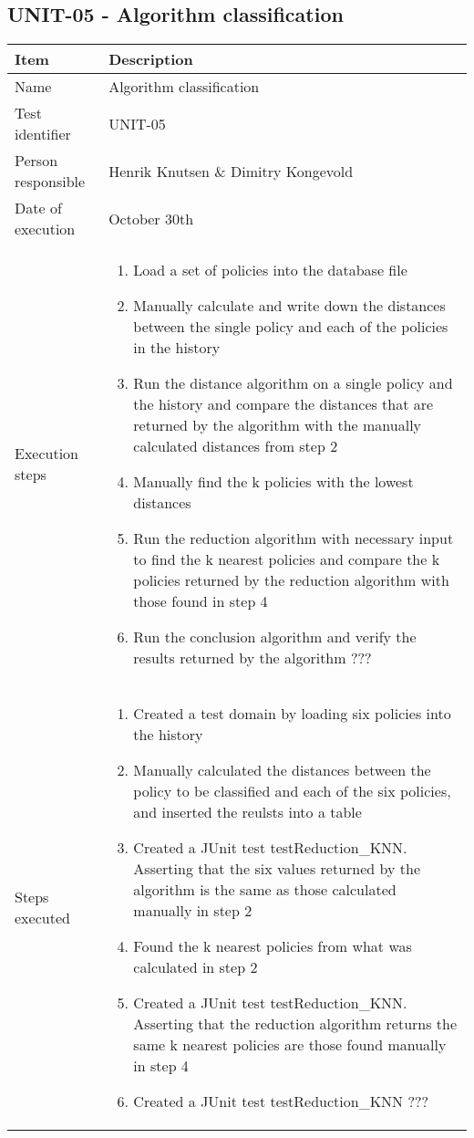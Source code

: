 \documentclass[a4paper]{article}
\begin{document}
\subsection{UNIT-05 - Algorithm classification}
			\begin{center}
		\begin{tabular}{ |  p{3cm} | p{7cm} | }
			\hline
			Item & Description \\ [5pt] \hline \hline
			Name & Algorithm classification \\  [5pt] \hline
			Test identifier & UNIT-05 \\  [5pt] \hline
			Person responsible & Henrik Knutsen \& Dimitry Kongevold \\  [5pt] \hline
			Date of execution & October 30th \\  [5pt] \hline

			Execution steps & 	\begin{enumerate}
							\item Load a set of policies into the database file
							\item Manually calculate and write down the distances between the single policy and each of the policies in the history
							\item Run the distance algorithm on a single policy and the history and compare the distances that are returned by the algorithm with the manually calculated distances from step 2
							\item Manually find the k policies with the lowest distances
							\item Run the reduction algorithm with necessary input to find the k nearest policies and compare the k policies returned by the reduction algorithm with those found in step 4
							\item Run the conclusion algorithm and verify the results returned by the algorithm ???
						\end{enumerate} \\ [5pt] \hline

			Steps executed & 	\begin{enumerate}
							\item Created a test domain by loading six policies into the history
							\item Manually calculated the distances between the policy to be classified and each of the six policies, and inserted the reulsts into a table
							\item Created a JUnit test testReduction_KNN. Asserting that the six values returned by the algorithm is the same as those calculated manually in step 2
							\item Found the k nearest policies from what was calculated in step 2
							\item Created a JUnit test testReduction_KNN. Asserting that the reduction algorithm returns the same k nearest policies are those found manually in step 4
							\item Created a JUnit test testReduction_KNN ???
						\end{enumerate} \\ [5pt] \hline
			

\end{tabular}
\end{center}
\end{document}
